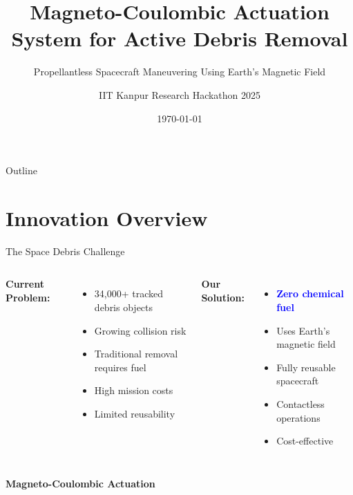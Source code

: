 \documentclass[aspectratio=169]{beamer}
\title{Magneto-Coulombic Actuation System for Active Debris Removal}
\subtitle{Propellantless Spacecraft Maneuvering Using Earth's Magnetic Field}
\author{IIT Kanpur Research Hackathon 2025}
\date{\today}
\begin{document}
\begin{frame}
\titlepage
\end{frame}

\begin{frame}{Outline}
\tableofcontents
\end{frame}

\section{Innovation Overview}

\begin{frame}{The Space Debris Challenge}
\begin{columns}
\textbf{Current Problem:}
\begin{itemize}
    \item 34,000+ tracked debris objects
    \item Growing collision risk
    \item Traditional removal requires fuel
    \item High mission costs
    \item Limited reusability
\end{itemize}

\textbf{Our Solution:}
\begin{itemize}
    \item \textcolor{blue}{\textbf{Zero chemical fuel}}
    \item Uses Earth's magnetic field
    \item Fully reusable spacecraft
    \item Contactless operations
    \item Cost-effective
\end{itemize}
\end{columns}

\vspace{1em}
\begin{center}
\Large\textbf{Magneto-Coulombic Actuation}
\end{center}
\end{frame}
\end{document}
